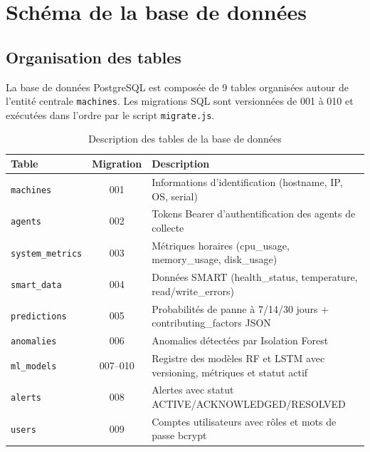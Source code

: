 \section{Schéma de la base de données}

\subsection{Organisation des tables}

La base de données PostgreSQL est composée de 9 tables organisées autour de l'entité
centrale \texttt{machines}. Les migrations SQL sont versionnées de 001 à 010 et
exécutées dans l'ordre par le script \texttt{migrate.js}.

\begin{table}[H]
\centering
\caption{Description des tables de la base de données}
\begin{tabularx}{\textwidth}{|l|c|X|}
\hline
\rowcolor{lightblue}
\textbf{Table} & \textbf{Migration} & \textbf{Description} \\
\hline
\texttt{machines}        & 001 & Informations d'identification (hostname, IP, OS, serial) \\
\hline
\texttt{agents}          & 002 & Tokens Bearer d'authentification des agents de collecte \\
\hline
\texttt{system\_metrics} & 003 & Métriques horaires (cpu\_usage, memory\_usage, disk\_usage) \\
\hline
\texttt{smart\_data}     & 004 & Données SMART (health\_status, temperature, read/write\_errors) \\
\hline
\texttt{predictions}     & 005 & Probabilités de panne à 7/14/30 jours + contributing\_factors JSON \\
\hline
\texttt{anomalies}       & 006 & Anomalies détectées par Isolation Forest \\
\hline
\texttt{ml\_models}      & 007--010 & Registre des modèles RF et LSTM avec versioning, métriques et statut actif \\
\hline
\texttt{alerts}          & 008 & Alertes avec statut ACTIVE/ACKNOWLEDGED/RESOLVED \\
\hline
\texttt{users}           & 009 & Comptes utilisateurs avec rôles et mots de passe bcrypt \\
\hline
\end{tabularx}
\end{table}

